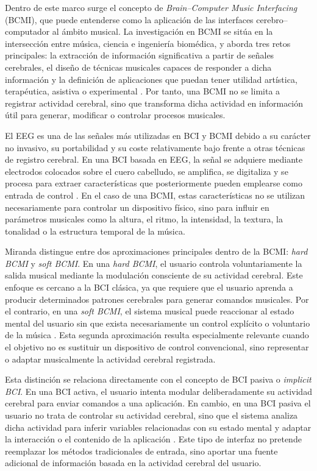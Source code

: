 \documentclass[../main.tex]{subfiles}
\begin{document}
Dentro de este marco surge el concepto de \textit{Brain--Computer Music Interfacing} (BCMI), que puede entenderse como la aplicación de las interfaces cerebro--computador al ámbito musical. La investigación en BCMI se sitúa en la intersección entre música, ciencia e ingeniería biomédica, y aborda tres retos principales: la extracción de información significativa a partir de señales cerebrales, el diseño de técnicas musicales capaces de responder a dicha información y la definición de aplicaciones que puedan tener utilidad artística, terapéutica, asistiva o experimental \cite{Miranda2014BCMI}. Por tanto, una BCMI no se limita a registrar actividad cerebral, sino que transforma dicha actividad en información útil para generar, modificar o controlar procesos musicales.

El EEG es una de las señales más utilizadas en BCI y BCMI debido a su carácter no invasivo, su portabilidad y su coste relativamente bajo frente a otras técnicas de registro cerebral. En una BCI basada en EEG, la señal se adquiere mediante electrodos colocados sobre el cuero cabelludo, se amplifica, se digitaliza y se procesa para extraer características que posteriormente pueden emplearse como entrada de control \cite{Palaniappan2014}. En el caso de una BCMI, estas características no se utilizan necesariamente para controlar un dispositivo físico, sino para influir en parámetros musicales como la altura, el ritmo, la intensidad, la textura, la tonalidad o la estructura temporal de la música.

Miranda distingue entre dos aproximaciones principales dentro de la BCMI: \textit{hard BCMI} y \textit{soft BCMI}. En una \textit{hard BCMI}, el usuario controla voluntariamente la salida musical mediante la modulación consciente de su actividad cerebral. Este enfoque es cercano a la BCI clásica, ya que requiere que el usuario aprenda a producir determinados patrones cerebrales para generar comandos musicales. Por el contrario, en una \textit{soft BCMI}, el sistema musical puede reaccionar al estado mental del usuario sin que exista necesariamente un control explícito o voluntario de la música \cite{Miranda2014BCMI}. Esta segunda aproximación resulta especialmente relevante cuando el objetivo no es sustituir un dispositivo de control convencional, sino representar o adaptar musicalmente la actividad cerebral registrada.

Esta distinción se relaciona directamente con el concepto de BCI pasiva o \textit{implicit BCI}. En una BCI activa, el usuario intenta modular deliberadamente su actividad cerebral para enviar comandos a una aplicación. En cambio, en una BCI pasiva el usuario no trata de controlar su actividad cerebral, sino que el sistema analiza dicha actividad para inferir variables relacionadas con su estado mental y adaptar la interacción o el contenido de la aplicación \cite{GeorgeLecuyer2014PassiveBCI}. Este tipo de interfaz no pretende reemplazar los métodos tradicionales de entrada, sino aportar una fuente adicional de información basada en la actividad cerebral del usuario.
\end{document}
